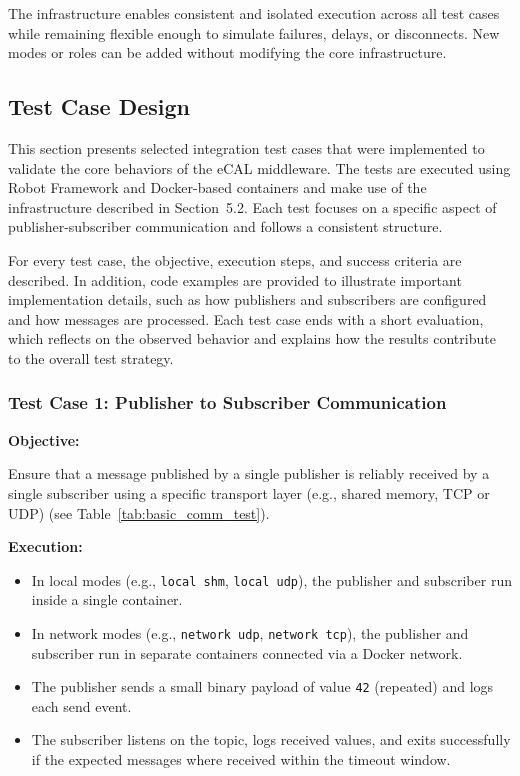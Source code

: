 \vspace{1em}
The infrastructure enables consistent and isolated execution across all test cases while remaining flexible enough to simulate failures, delays, or disconnects. New modes or roles can be added without modifying the core infrastructure.

\subsection{Test Case Design}

This section presents selected integration test cases that were implemented to validate the core behaviors of the eCAL middleware. The tests are executed using Robot Framework and Docker-based containers and make use of the infrastructure described in Section~5.2. Each test focuses on a specific aspect of publisher-subscriber communication and follows a consistent structure.

\vspace{1em}
For every test case, the objective, execution steps, and success criteria are described. In addition, code examples are provided to illustrate important implementation details, such as how publishers and subscribers are configured and how messages are processed. Each test case ends with a short evaluation, which reflects on the observed behavior and explains how the results contribute to the overall test strategy.

\vspace{1em}
\subsubsection{Test Case 1: Publisher to Subscriber Communication}

\textbf{Objective:}

\vspace{0.4em}
Ensure that a message published by a single publisher is reliably received by a single subscriber using a specific transport layer (e.g., shared memory, TCP or UDP) (see Table~\ref{tab:basic_comm_test}).

\vspace{0.5em}
\textbf{Execution:}
\begin{itemize}
	\item In local modes (e.g., \texttt{local shm}, \texttt{local udp}), the publisher and subscriber run inside a single container.
	\item In network modes (e.g., \texttt{network udp}, \texttt{network tcp}), the publisher and subscriber run in separate containers connected via a Docker network.
	\item The publisher sends a small binary payload of value \texttt{42} (repeated) and logs each send event.
	\item The subscriber listens on the topic, logs received values, and exits successfully if the expected messages where received within the timeout window.
\end{itemize}


